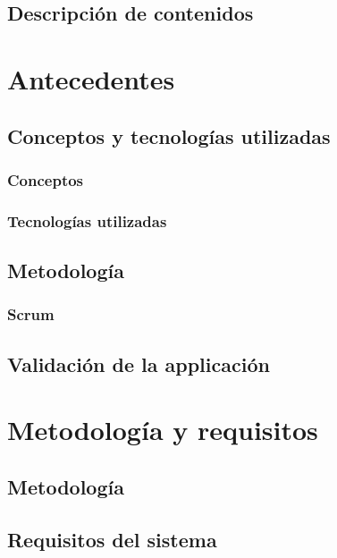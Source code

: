 \documentclass{iccmemoria}
\begin{document}
	\section{Descripción de contenidos}
	

\chapter{Antecedentes}
	\section{Conceptos y tecnologías utilizadas}
		\subsection{Conceptos}
		\subsection{Tecnologías utilizadas}

	\section{Metodología}
		\subsection{Scrum}
		
	
	\section{Validación de la applicación}
	

\chapter{Metodología y requisitos}
	\section{Metodología}
	

	\section{Requisitos del sistema}
	
\end{document}
